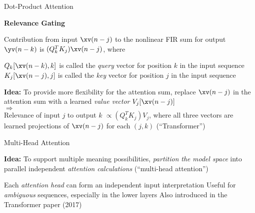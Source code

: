 \begin{slide}[\slideopts]{Dot-Product Attention}

\vspace{-1em}


\vspace{-1em}

\textbf{Relevance Gating}

Contribution from input $\xv(n-j)$ to the nonlinear FIR sum for output $\yv(n-k)$ is $(Q_k^T K_j)\xv(n-j)$, where
\begin{itemize}
  \mpitem $Q_k[\xv(n-k),k]$ is called the \emph{query} vector for position $k$ in the input sequence
  \mpitem $K_j[\xv(n-j),j]$ is called the \emph{key} vector for position $j$ in the input sequence
\end{itemize}

\maybepause

\textbf{Idea:} To provide more flexibility for the attention sum,
replace $\xv(n-j)$ in the attention sum with a learned \emph{value
vector} $V_j[\xv(n-j)]$\\
%
\maybepause
$\Rightarrow$\\
%
Relevance of input $j$ to output $k$ $\propto (Q_k^T K_j)V_j$, where
all three vectors are learned projections of $\xv(n-j)$ for each
$(j,k)$ (``Transformer'')

\end{slide}

\begin{slide}[\slideopts]{Multi-Head Attention}

\textbf{Idea:} To support multiple meaning possibilities, \emph{partition the model space} into\\
parallel independent \emph{attention calculations} (``multi-head attention'')


\begin{itemize}
  \mpitem Each \emph{attention head} can form an independent input interpretation
  \mpitem Useful for \emph{ambiguous} sequences, especially in the lower layers
  \mpitem Also introduced in the Transformer paper (2017)
\end{itemize}

\end{slide}

